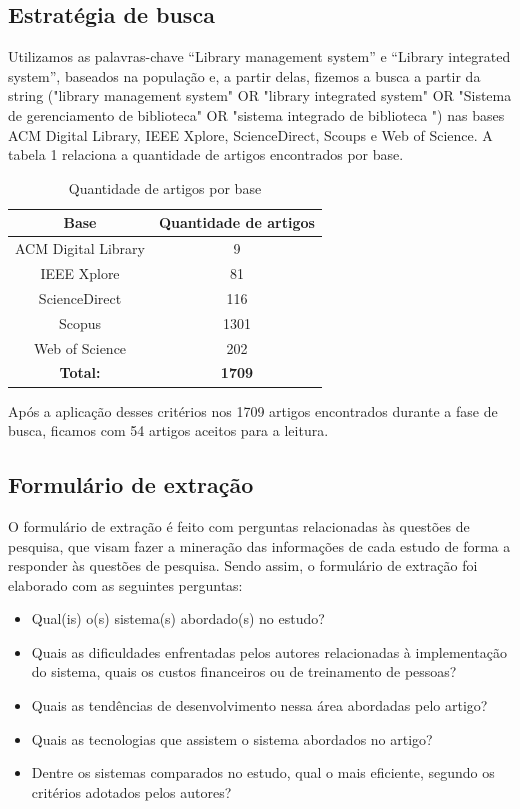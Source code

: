 \documentclass[12pt]{article}
\begin{document}
\subsection{Estratégia de busca}
Utilizamos as palavras-chave “Library management system” e “Library integrated system”, baseados na população e, a partir delas, fizemos a busca a partir da string ("library management system" OR "library integrated system" OR "Sistema de gerenciamento de biblioteca" OR "sistema integrado de biblioteca ") nas bases ACM Digital Library, IEEE Xplore, ScienceDirect, Scoups e Web of Science. A tabela 1 relaciona a quantidade de artigos encontrados por base. 
\begin{table}[!!ht]
 \caption{Quantidade de artigos por base}
  \centering
  \begin{tabular}{|c|c|}
    \toprule
    \textbf{Base} & \textbf{Quantidade de artigos}\\
    \toprule
    ACM Digital Library & 9\\
    \hline
    IEEE Xplore & 81 \\
    \hline
    ScienceDirect & 116 \\
    \hline
    Scopus & 1301 \\
    \hline
    Web of Science & 202 \\
    \hline
    \textbf{Total:} & \textbf{1709} \\
    \bottomrule
  \end{tabular}
  \label{tab:quantidadeArtigos}
\end{table}

Após a aplicação desses critérios nos 1709 artigos encontrados durante a fase de busca, ficamos com 54 artigos aceitos para a leitura.
\subsection{Formulário de extração}
O formulário de extração é feito com perguntas relacionadas às questões de pesquisa, que visam fazer a mineração das informações de cada estudo de forma a responder às questões de pesquisa. Sendo assim, o formulário de extração foi elaborado com as seguintes perguntas:
\begin{itemize}
    \item Qual(is) o(s) sistema(s) abordado(s) no estudo?
    \item Quais as dificuldades enfrentadas pelos autores relacionadas à implementação do sistema, quais os custos financeiros ou de treinamento de pessoas?
    \item Quais as tendências de desenvolvimento nessa área abordadas pelo artigo?
    \item Quais as tecnologias que assistem o sistema abordados no artigo?
    \item Dentre os sistemas comparados no estudo, qual o mais eficiente, segundo os critérios adotados pelos autores?
\end{itemize}
\end{document}
